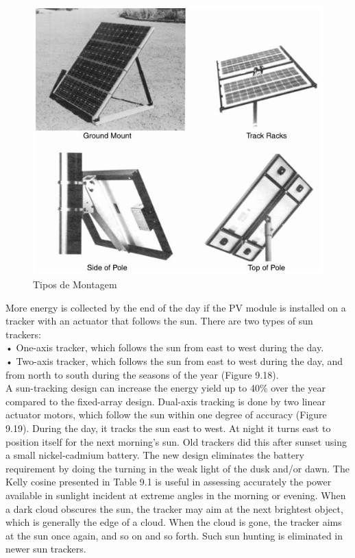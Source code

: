 \begin{figure}[H]
\centering
\includegraphics[scale=0.7]{./image/Mount_Method.jpg}
\caption{Tipos de Montagem \cite{book_2}}
\end{figure}

\newpage



More energy is collected by the end of the day if the PV module is installed on a tracker with an actuator that follows the sun. There are two types of sun trackers:\\
• One-axis tracker, which follows the sun from east to west during the day.\\
• Two-axis tracker, which follows the sun from east to west during the day, and from north to south during the seasons of the year (Figure 9.18).\cite{book_2} \\

A sun-tracking design can increase the energy yield up to 40\% over the year compared to the fixed-array design. Dual-axis tracking is done by two linear actuator motors, which follow the sun within one degree of accuracy (Figure 9.19). During the day, it tracks the sun east to west. At night it turns east to position itself for the next morning’s sun. Old trackers did this after sunset using a small nickel-cadmium battery. The new design eliminates the battery requirement by doing the turning in the weak light of the dusk and/or dawn. The Kelly cosine presented in Table 9.1 is useful in assessing accurately the power available in sunlight incident at extreme angles in the morning or evening. When a dark cloud obscures the sun, the tracker may aim at the next brightest object, which is generally the edge of a cloud. When the cloud is gone, the tracker aims at the sun once again, and so on and so forth. Such sun hunting is eliminated in newer sun trackers. \cite{book_2}\\

